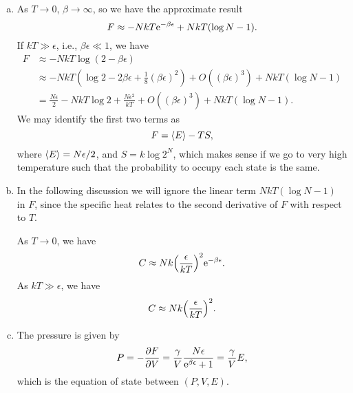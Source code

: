 \documentclass[10pt]{article}
\begin{document}
\begin{enumerate}[(a)]
	\item As $T \to 0$, $\beta \to \infty$, so we have the approximate result 
		\begin{equation}
			F \approx -NkT {\mathrm{e}}^{- \beta \epsilon} + NkT(\log{N} -1).
		\end{equation}
		 If $kT \gg \epsilon$, i.e., $\beta \epsilon \ll 1$, we have 
		 \begin{align*}
			 F &\approx -NkT \log(2-\beta \epsilon) \\
			   &\approx -NkT (\log{2} -2\beta \epsilon + \frac{1}{8}(\beta \epsilon)^2) + O((\beta \epsilon)^3) + NkT(\log{N} -1) \\
			   &= \frac{N\epsilon}{2} - NkT \log{2} + \frac{N \epsilon^2}{kT} + O((\beta \epsilon)^3) + NkT(\log{N} -1).
		 \end{align*}
		 We may identify the first two terms as 
		 \begin{equation}
			 F = \ev{E} - T S,
		 \end{equation}
		 where $\ev{E} = N \epsilon / 2$, and $S = k \log{2^N}$, which makes sense if we go to  very high temperature such that the probability to occupy each state is the same.
	 \item In the following discussion we will ignore the linear term $NkT(\log{N} -1)$ in $F$, since the specific heat relates to the second derivative of $F$ with respect to $T$.

		 As $T \to 0$, we have 
		 \begin{equation}
			 C \approx Nk \qty(\frac{\epsilon}{kT})^2 {\mathrm{e}}^{-\beta \epsilon}. 
		 \end{equation}
		 As $kT \gg \epsilon$, we have 
		 \begin{equation}
		 	C \approx Nk \qty(\frac{\epsilon}{kT})^2.
		 \end{equation}
	 \item The pressure is given by 
		 \begin{equation}
			 P = - \pdv{F}{V} = \frac{\gamma}{V} \frac{N \epsilon}{{\mathrm{e}}^{\beta \epsilon} + 1} = \frac{\gamma}{V} E,
		 \end{equation}
		 which is the equation of state between $(P,V,E)$.
\end{enumerate}
\end{document}
